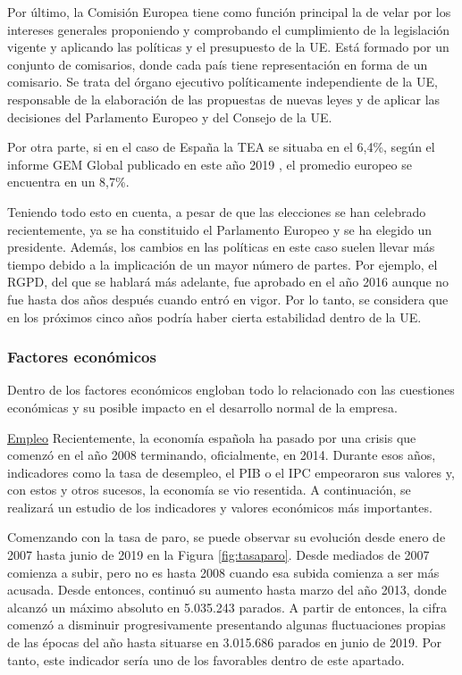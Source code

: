 Por último, la Comisión Europea tiene como función principal la de velar por los intereses generales proponiendo y comprobando el cumplimiento de la legislación vigente y aplicando las políticas y el presupuesto de la \acs{UE}. Está formado por un conjunto de comisarios, donde cada país tiene representación en forma de un comisario. Se trata del órgano ejecutivo políticamente independiente de la \acs{UE}, responsable de la elaboración de las propuestas de nuevas leyes y de aplicar las decisiones del Parlamento Europeo y del Consejo de la \acs{UE}.

Por otra parte, si en el caso de España la \acs{TEA} se situaba en el 6,4\%, según el informe \acs{GEM} Global publicado en este año 2019 \cite{informegemglobal}, el promedio europeo se encuentra en un 8,7\%.

Teniendo todo esto en cuenta, a pesar de que las elecciones se han celebrado recientemente, ya se ha constituido el Parlamento Europeo y se ha elegido un presidente. Además, los cambios en las políticas en este caso suelen llevar más tiempo debido a la implicación de un mayor número de partes. Por ejemplo, el \acf{RGPD}, del que se hablará más adelante, fue aprobado en el año 2016 aunque no fue hasta dos años después cuando entró en vigor. Por lo tanto, se considera que en los próximos cinco años podría haber cierta estabilidad dentro de la \acs{UE}.

\clearpage

\subsubsection{Factores económicos}
Dentro de los factores económicos engloban todo lo relacionado con las cuestiones económicas y su posible impacto en el desarrollo normal de la empresa.

\noindent\underline{Empleo}\newline
\indent Recientemente, la economía española ha pasado por una crisis que comenzó en el año 2008 terminando, oficialmente, en 2014. Durante esos años, indicadores como la tasa de desempleo, el \acf{PIB} o el \acf{IPC} empeoraron sus valores y, con estos y otros sucesos, la economía se vio resentida. A continuación, se realizará un estudio de los indicadores y valores económicos más importantes.

Comenzando con la tasa de paro, se puede observar su evolución desde enero de 2007 hasta junio de 2019 en la Figura \ref{fig:tasaparo}. Desde mediados de 2007 comienza a subir, pero no es hasta 2008 cuando esa subida comienza a ser más acusada. Desde entonces, continuó su aumento hasta marzo del año 2013, donde alcanzó un máximo absoluto en 5.035.243 parados. A partir de entonces, la cifra comenzó a disminuir progresivamente presentando algunas fluctuaciones propias de las épocas del año hasta situarse en 3.015.686 parados en junio de 2019. Por tanto, este indicador sería uno de los favorables dentro de este apartado.


